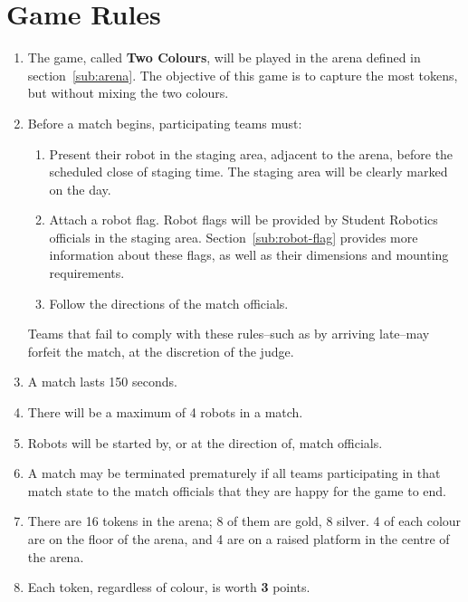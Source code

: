 \section {Game Rules}
\label{game-rules}

\begin{enumerate}
\item The game, called \textbf{Two Colours}, will be played in the arena defined in section~\ref{sub:arena}.  The objective of this game is to capture the most tokens, but without mixing the two colours.

\item Before a match begins, participating teams must:
\begin {enumerate}
  \item Present their robot in the staging area, adjacent to the arena, before the scheduled close of staging time.
        The staging area will be clearly marked on the day.

  \item Attach a robot flag.
        Robot flags will be provided by Student Robotics officials in the staging area.
        Section~\ref{sub:robot-flag} provides more information about these flags, as well as their dimensions and mounting requirements.

  \item Follow the directions of the match officials.
\end{enumerate}
  Teams that fail to comply with these rules--such as by arriving late--may forfeit the match, at the discretion of the judge.

\item A match lasts 150 seconds.

\item There will be a maximum of 4 robots in a match.

\item Robots will be started by, or at the direction of, match officials.

\item A match may be terminated prematurely if all teams participating in that match state to the match officials that they are happy for the game to end.

\item There are 16 tokens in the arena; 8 of them are gold, 8 silver. 4 of each colour are on the floor of the arena, and 4 are on a raised platform in the centre of the arena.

\item Each token, regardless of colour, is worth \textbf{3} points.


\end{enumerate}
